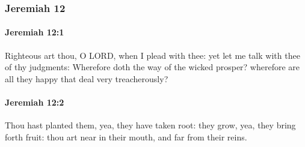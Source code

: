 	\subsubsection{Jeremiah 12} %
		\label{JEREMIAH-12}

		\paragraph{Jeremiah 12:1} %
			\label{JEREMIAH-12-1}

			Righteous art thou, O LORD, when I plead with thee: yet let me talk with thee of thy judgments: Wherefore doth the way of the wicked prosper? wherefore are all they happy that deal very treacherously?


		\paragraph{Jeremiah 12:2} %
			\label{JEREMIAH-12-2}

			Thou hast planted them, yea, they have taken root: they grow, yea, they bring forth fruit: thou art near in their mouth, and far from their reins.


